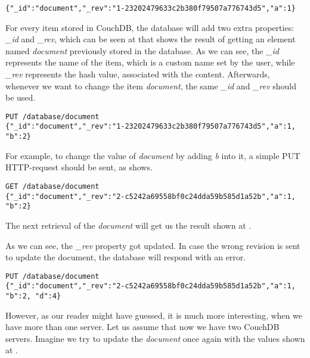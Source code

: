 \begin{lstlisting}[caption={A typical result of retrieving the item \textit{document} stored in CouchDB.}, label={lst:rwork1}]
{"_id":"document","_rev":"1-23202479633c2b380f79507a776743d5","a":1}
\end{lstlisting}

For every item stored in CouchDB, the database will add two extra properties: \textit{\_id} and \textit{\_rev}, which can be seen at  that shows the result of getting an element named \textit{document} previously stored in the database. As we can see, the \textit{\_id} represents the name of the item, which is a custom name set by the user, while \textit{\_rev} represents the hash value, associated with the content. Afterwards, whenever we want to change the item \textit{document}, the same \textit{\_id} and \textit{\_rev} should be used.

\begin{lstlisting}[caption={Updating the value of item \textit{document} by adding \textit{b} into it.}, label={lst:rwork2}]
PUT /database/document
{"_id":"document","_rev":"1-23202479633c2b380f79507a776743d5","a":1, "b":2}
\end{lstlisting}

For example, to change the value of \textit{document} by adding \textit{b} into it, a simple PUT HTTP-request should be sent, as  shows.

\begin{lstlisting}[caption={The result of requesting the updated version of \textit{document}}, label={lst:rwork3}]
GET /database/document
{"_id":"document","_rev":"2-c5242a69558bf0c24dda59b585d1a52b","a":1, "b":2}
\end{lstlisting}

The next retrieval of the \textit{document} will get us the result shown at .

As we can see, the \textit{\_rev} property got updated. In case the wrong revision is sent to update the document, the database will respond with an error.

\begin{lstlisting}[caption={Updating the value of item \textit{document} by adding \textit{d} into it.}, label={lst:rwork4}]
PUT /database/document
{"_id":"document","_rev":"2-c5242a69558bf0c24dda59b585d1a52b","a":1, "b":2, "d":4}
\end{lstlisting}

However, as our reader might have guessed, it is much more interesting, when we have more than one server. Let us assume that now we have two CouchDB servers. Imagine we try to update the \textit{document} once again with the values shown at .


